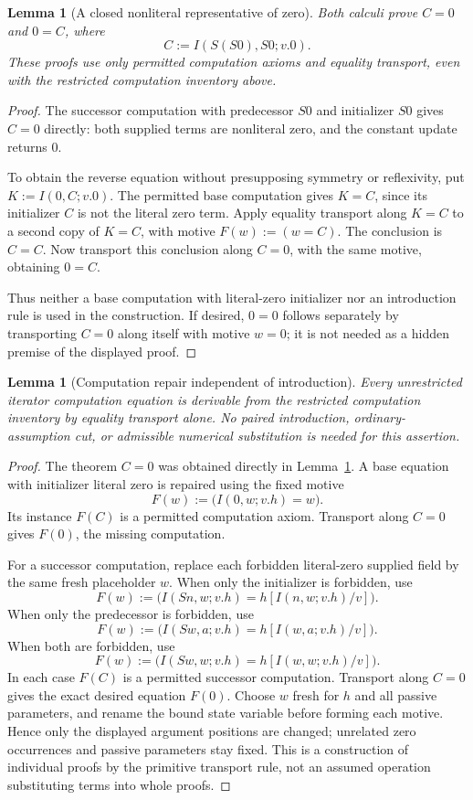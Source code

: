 \documentclass[11pt,letterpaper]{article}
\newtheorem{lemma}[theorem]{Lemma}
\theoremstyle{definition}\newtheorem{definition}[theorem]{Definition}
\theoremstyle{remark}\newtheorem{remark}[theorem]{Remark}
\begin{document}
\begin{lemma}[A closed nonliteral representative of zero]
\label{lem:det-witness-zero}
Both calculi prove $C=0$ and $0=C$, where
\[
 C:=I(S(S0),S0;v.0).
\]
These proofs use only permitted computation axioms and equality
transport, even with the restricted computation inventory above.
\end{lemma}
\begin{proof}
The successor computation with predecessor $S0$ and initializer $S0$
gives $C=0$ directly: both supplied terms are nonliteral zero, and the
constant update returns $0$.

To obtain the reverse equation without presupposing symmetry or
reflexivity, put $K:=I(0,C;v.0)$.  The permitted base computation gives
$K=C$, since its initializer $C$ is not the literal zero term.  Apply
equality transport along $K=C$ to a second copy of $K=C$, with motive
$F(w):=(w=C)$.  The conclusion is $C=C$.  Now transport this conclusion
along $C=0$, with the same motive, obtaining $0=C$.

Thus neither a base computation with literal-zero initializer nor an
introduction rule is used in the construction.  If desired, $0=0$
follows separately by transporting $C=0$ along itself with motive
$w=0$; it is not needed as a hidden premise of the displayed proof.
\end{proof}

\begin{lemma}[Computation repair independent of introduction]
\label{lem:det-witness-computation-repair}
Every unrestricted iterator computation equation is derivable from the
restricted computation inventory by equality transport alone.  No
paired introduction, ordinary-assumption cut, or admissible numerical
substitution is needed for this assertion.
\end{lemma}
\begin{proof}
The theorem $C=0$ was obtained directly in
Lemma~\ref{lem:det-witness-zero}.  A base equation with initializer
literal zero is repaired using the fixed motive
\[
 F(w):=\bigl(I(0,w;v.h)=w\bigr).
\]
Its instance $F(C)$ is a permitted computation axiom.  Transport along
$C=0$ gives $F(0)$, the missing computation.

For a successor computation, replace each forbidden literal-zero
supplied field by the same fresh placeholder $w$.  When only the
initializer is forbidden, use
\[
 F(w):=\bigl(I(Sn,w;v.h)=h[I(n,w;v.h)/v]\bigr).
\]
When only the predecessor is forbidden, use
\[
 F(w):=\bigl(I(Sw,a;v.h)=h[I(w,a;v.h)/v]\bigr).
\]
When both are forbidden, use
\[
 F(w):=\bigl(I(Sw,w;v.h)=h[I(w,w;v.h)/v]\bigr).
\]
In each case $F(C)$ is a permitted successor computation.  Transport
along $C=0$ gives the exact desired equation $F(0)$.  Choose $w$ fresh
for $h$ and all passive parameters, and rename the bound state variable
before forming each motive.  Hence only the displayed argument positions
are changed; unrelated zero occurrences and passive parameters stay fixed.
This is a construction of individual proofs by the primitive transport
rule, not an assumed operation substituting terms into whole proofs.
\end{proof}
\end{document}
